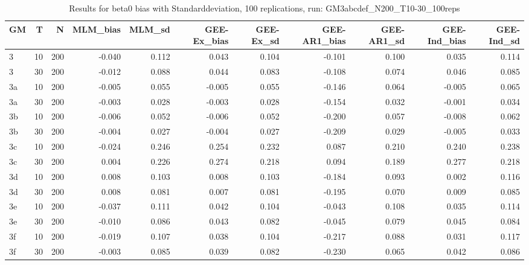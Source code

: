 \begin{table}[ht]
\centering
\begin{tabular}{lrrrrrrrrrr}
  \hline
GM & T & N & MLM\_bias & MLM\_sd & GEE-Ex\_bias & GEE-Ex\_sd & GEE-AR1\_bias & GEE-AR1\_sd & GEE-Ind\_bias & GEE-Ind\_sd \\ 
  \hline
3 & 10 & 200 & -0.040 & 0.112 & 0.043 & 0.104 & -0.101 & 0.100 & 0.035 & 0.114 \\ 
  3 & 30 & 200 & -0.012 & 0.088 & 0.044 & 0.083 & -0.108 & 0.074 & 0.046 & 0.085 \\ 
  3a & 10 & 200 & -0.005 & 0.055 & -0.005 & 0.055 & -0.146 & 0.064 & -0.005 & 0.065 \\ 
  3a & 30 & 200 & -0.003 & 0.028 & -0.003 & 0.028 & -0.154 & 0.032 & -0.001 & 0.034 \\ 
  3b & 10 & 200 & -0.006 & 0.052 & -0.006 & 0.052 & -0.200 & 0.057 & -0.008 & 0.062 \\ 
  3b & 30 & 200 & -0.004 & 0.027 & -0.004 & 0.027 & -0.209 & 0.029 & -0.005 & 0.033 \\ 
  3c & 10 & 200 & -0.024 & 0.246 & 0.254 & 0.232 & 0.087 & 0.210 & 0.240 & 0.238 \\ 
  3c & 30 & 200 & 0.004 & 0.226 & 0.274 & 0.218 & 0.094 & 0.189 & 0.277 & 0.218 \\ 
  3d & 10 & 200 & 0.008 & 0.103 & 0.008 & 0.103 & -0.184 & 0.093 & 0.002 & 0.116 \\ 
  3d & 30 & 200 & 0.008 & 0.081 & 0.007 & 0.081 & -0.195 & 0.070 & 0.009 & 0.085 \\ 
  3e & 10 & 200 & -0.037 & 0.111 & 0.042 & 0.104 & -0.043 & 0.108 & 0.035 & 0.114 \\ 
  3e & 30 & 200 & -0.010 & 0.086 & 0.043 & 0.082 & -0.045 & 0.079 & 0.045 & 0.084 \\ 
  3f & 10 & 200 & -0.019 & 0.107 & 0.038 & 0.104 & -0.217 & 0.088 & 0.031 & 0.117 \\ 
  3f & 30 & 200 & -0.003 & 0.085 & 0.039 & 0.082 & -0.230 & 0.065 & 0.042 & 0.086 \\ 
   \hline
\end{tabular}
\caption{Results for beta0 bias with Standarddeviation, 100 replications, run: GM3abcdef_N200_T10-30_100reps} 
\label{tab:beta0_bias_sd}
\end{table}
